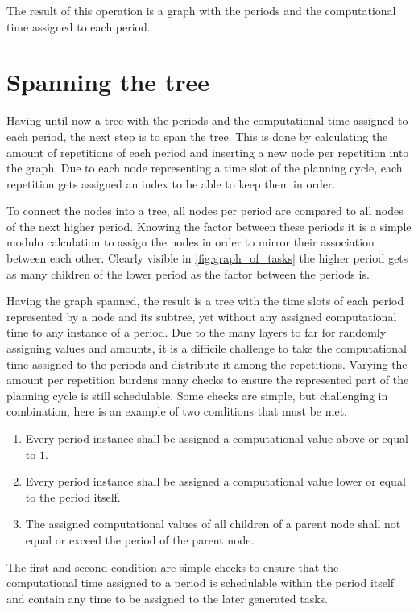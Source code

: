 The result of this operation is a graph with the periods and the computational time assigned to each period.

\section{Spanning the tree}\label{subsec:impl:spanning-the-tree}
Having until now a tree with the periods and the computational time assigned to each period, the next step is to span the tree.
This is done by calculating the amount of repetitions of each period and inserting a new node per repetition into the graph.
Due to each node representing a time slot of the planning cycle, each repetition gets assigned an index to be able to keep them in order.

To connect the nodes into a tree, all nodes per period are compared to all nodes of the next higher period.
Knowing the factor between these periods it is a simple modulo calculation to assign the nodes in order to mirror their association between each other.
Clearly visible in \cref{fig:graph_of_tasks} the higher period gets as many children of the lower period as the factor between the periods is.

Having the graph spanned, the result is a tree with the time slots of each period represented by a node and its subtree, yet without any assigned computational time to any instance of a period.
Due to the many layers to far for randomly assigning values and amounts, it is a difficile challenge to take the computational time assigned to the periods and distribute it among the repetitions.
Varying the amount per repetition burdens many checks to ensure the represented part of the planning cycle is still schedulable.
Some checks are simple, but challenging in combination, here is an example of two conditions that must be met.

\begin{enumerate}
	\item Every period instance shall be assigned a computational value above or equal to $1$.
	\item Every period instance shall be assigned a computational value lower or equal to the period itself.
	\item The assigned computational values of all children of a parent node shall not equal or exceed the period of the parent node.
\end{enumerate}

The first and second condition are simple checks to ensure that the computational time assigned to a period is schedulable within the period itself and contain any time to be assigned to the later generated tasks.

